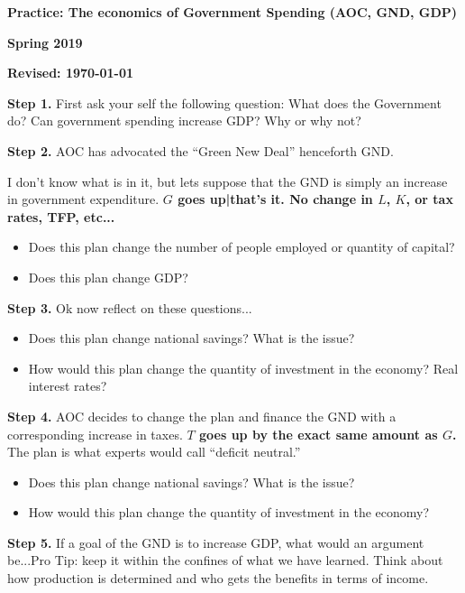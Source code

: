 \documentclass[12pt,pdftex,twoside,letterpaper]{exam}
\begin{document}
\centerline{\large\bf Practice: The economics of Government Spending (AOC, GND, GDP)}
\vspace{1mm}
\centerline{\large\bf Spring 2019}
\vspace{3mm}
\centerline{\bf Revised:  \today}
\bigskip
\bigskip

\textbf{Step 1.} First ask your self the following question: What does the Government do? Can government spending increase GDP? Why or why not?\\
\bigskip



\textbf{Step 2.} AOC has advocated the ``Green New Deal'' henceforth GND.

I don't know what is in it, but lets suppose that the GND is simply an increase in government expenditure. \textbf{$G$ goes up|that's it. No change in $L$, $K$, or tax rates, TFP, etc...}
\begin{itemize}
\item Does this plan change the number of people employed or quantity of capital? 

\item Does this plan change GDP? 
\end{itemize}
\bigskip

\textbf{Step 3.} Ok now reflect on these questions...
\begin{itemize}
\item Does this plan change national savings? What is the issue?

\item How would this plan change the quantity of investment in the economy? Real interest rates?
\end{itemize}
\bigskip

\textbf{Step 4.} AOC decides to change the plan and finance the GND with a corresponding increase in taxes. \textbf{$T$ goes up by the exact same amount as $G$.} The plan is what experts would call ``deficit neutral.''
\begin{itemize}
\item Does this plan change national savings? What is the issue?

\item How would this plan change the quantity of investment in the economy?
\end{itemize}
\bigskip

\textbf{{Step 5.}} If a goal of the GND is to increase GDP, what would an argument be...Pro Tip: keep it within the confines of what we have learned. Think about how production is determined and who gets the benefits in terms of income.
\end{document}
